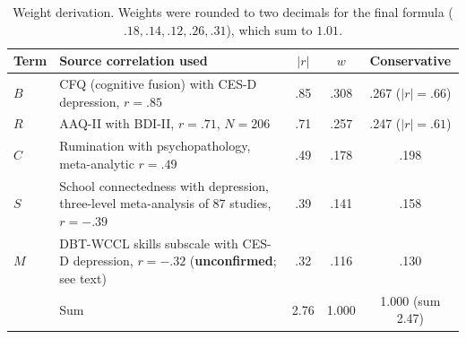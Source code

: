 \documentclass[11pt]{article}
\begin{document}
\begin{table}[h]
\centering\small
\begin{tabular}{@{}l p{7.4cm} c c c@{}}
\toprule
Term & Source correlation used & $|r|$ & $w$ & Conservative\\
\midrule
$B$ & CFQ (cognitive fusion) with CES-D depression, $r=.85$ \citep{gillanders2014} & .85 & .308 & .267 ($|r|=.66$)\\
$R$ & AAQ-II with BDI-II, $r=.71$, $N=206$ \citep{bond2011} & .71 & .257 & .247 ($|r|=.61$)\\
$C$ & Rumination with psychopathology, meta-analytic $r=.49$ \citep{aldao2010} & .49 & .178 & .198\\
$S$ & School connectedness with depression, three-level meta-analysis of 87 studies, $r=-.39$ \citep{meng2024} & .39 & .141 & .158\\
$M$ & DBT-WCCL skills subscale with CES-D depression, $r=-.32$ (\textbf{unconfirmed}; see text) & .32 & .116 & .130\\
\midrule
 & Sum & 2.76 & 1.000 & 1.000 (sum 2.47)\\
\bottomrule
\end{tabular}
\caption{Weight derivation. Weights were rounded to two decimals for the final formula ($.18, .14, .12, .26, .31$), which sum to $1.01$.}
\label{tab:weights}
\end{table}
\end{document}
